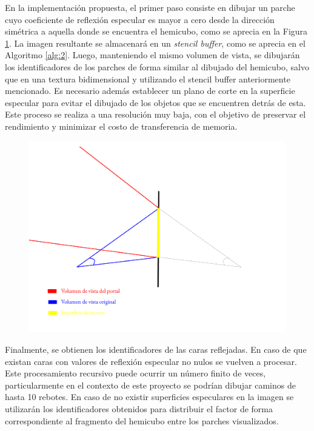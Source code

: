 En la implementación propuesta, el primer paso consiste en dibujar un parche cuyo coeficiente de reflexión especular es mayor a cero desde la dirección simétrica a aquella donde se encuentra el hemicubo, como se aprecia en la Figura \ref{img:espejo}. La imagen resultante se almacenará en un \textit{stencil buffer}, como se aprecia en el Algoritmo \ref{alg:2}. Luego, manteniendo el mismo volumen de vista, se dibujarán los identificadores de los parches de forma similar al dibujado del hemicubo, salvo que en una textura bidimensional y utilizando el stencil buffer anteriormente mencionado. Es necesario además establecer un plano de corte en la superficie especular para evitar el dibujado de los objetos que se encuentren detrás de esta. Este proceso se realiza a una resolución muy baja, con el objetivo de preservar el rendimiento y minimizar el costo de transferencia de memoria.

\begin{figure}[H]
	\centering
	\includegraphics[width=.9\linewidth]{assets/Espejo}
	\label{img:espejo}
\end{figure}

Finalmente, se obtienen los identificadores de las caras reflejadas. En caso de que existan caras con valores de reflexión especular no nulos se vuelven a procesar. Este procesamiento recursivo puede ocurrir un número finito de veces, particularmente en el contexto de este proyecto se podrían dibujar caminos de hasta 10 rebotes. En caso de no existir superficies especulares en la imagen se utilizarán los identificadores obtenidos para distribuir el factor de forma correspondiente al fragmento del hemicubo entre los parches visualizados.

